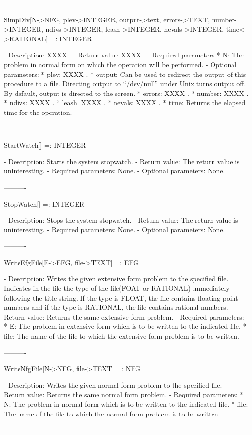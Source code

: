 ----------

SimpDiv[N->NFG, {plev->INTEGER}, {output->text}, {errors->TEXT},
	{number->INTEGER}, {ndivs->INTEGER}, {leash->INTEGER}, 
	{nevals->INTEGER}, {time<->RATIONAL}] =: INTEGER

   -	Description:  XXXX .
   -	Return value:  XXXX .
   -	Required parameters
	  *  N:  The problem in normal form on which the operation will be 
		performed.
   -	Optional parameters:
	  *  plev: XXXX .
	  *  output:  Can be used to redirect the output of this procedure to a
		file.  Directing output to ``/dev/null'' under Unix turns 
		output off.  By default, output is directed to the screen.
	  *  errors:  XXXX .
	  *  number:  XXXX .
	  *  ndivs:  XXXX .
	  *  leash:  XXXX .
	  *  nevals:  XXXX .
	  *  time:  Returns the elapsed time for the operation.

----------

StartWatch[] =: INTEGER

   -	Description:  Starts the system stopwatch.  
   -	Return value:  The return value is uninteresting.
   -	Required parameters:  None.
   -	Optional parameters:  None.

----------

StopWatch[] =: INTEGER

   -	Description:  Stops the system stopwatch.  
   -	Return value:  The return value is uninteresting.
   -	Required parameters:  None.
   -	Optional parameters:  None.

----------

WriteEfgFile[E->EFG, file->TEXT] =: EFG

   -	Description:  Writes the given extensive form problem to the specified 
	file.  Indicates in the file the type of the file(FOAT or RATIONAL) 
	immediately following the title string.  If the type is FLOAT, the file
	contains floating point numbers and if the type is RATIONAL, the file
	contains rational numbers.  
   -	Return value:  Returns the same extensive form problem.
   -	Required parameters:
	  *  E:  The problem in extensive form which is to be written to the
		indicated file.
	  *  file:  The name of the file to which the extensive form problem is
		to be written.

----------

WriteNfgFile[N->NFG, file->TEXT] =: NFG

   -	Description:  Writes the given normal form problem to the specified 
	file.  
   -	Return value:  Returns the same normal form problem.
   -	Required parameters:
	  *  N:  The problem in normal form which is to be written to the
		indicated file.
	  *  file:  The name of the file to which the normal form problem is
		to be written.

----------





























